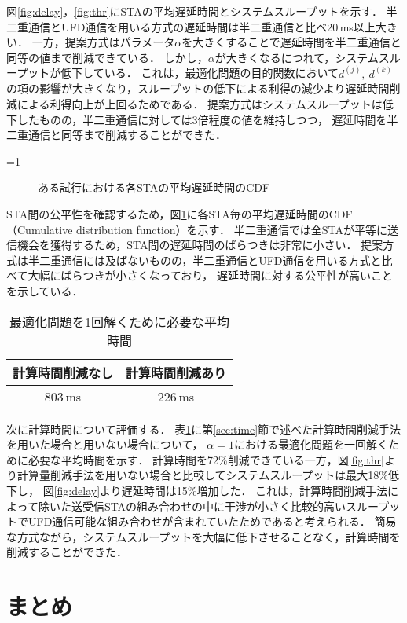 \documentclass[technicalreport]{ieicej}
\newcounter{flagFig}
\begin{document}
			\par
			図\ref{fig:delay}，\ref{fig:thr}にSTAの平均遅延時間とシステムスループットを示す．
			半二重通信とUFD通信を用いる方式の遅延時間は半二重通信と比べ20\,ms以上大きい．
			一方，提案方式はパラメータ$\alpha$を大きくすることで遅延時間を半二重通信と同等の値まで削減できている．
			しかし，$\alpha$が大きくなるにつれて，システムスループットが低下している．
			これは，最適化問題の目的関数において$d^{(j)},\ d^{(k)}$の項の影響が大きくなり，スループットの低下による利得の減少より遅延時間削減による利得向上が上回るためである．
			提案方式はシステムスループットは低下したものの，半二重通信に対しては3倍程度の値を維持しつつ，
			遅延時間を半二重通信と同等まで削減することができた．
			\par
			\ifnum\value{flagFig}=1 {\begin{figure}[t]
				\centering
					\caption{ある試行における各STAの平均遅延時間のCDF}
					\label{fig:cdf}
			\end{figure}}\fi
			STA間の公平性を確認するため，図\ref{fig:cdf}に各STA毎の平均遅延時間のCDF（Cumulative distribution function）を示す．
			半二重通信では全STAが平等に送信機会を獲得するため，STA間の遅延時間のばらつきは非常に小さい．
			提案方式は半二重通信には及ばないものの，半二重通信とUFD通信を用いる方式と比べて大幅にばらつきが小さくなっており，
			遅延時間に対する公平性が高いことを示している．



			\par
			\begin{table}[t]
				\centering
					\caption{最適化問題を1回解くために必要な平均時間}
					\label{tab:time}
					\begin{tabular}{cc}
						計算時間削減なし & 計算時間削減あり\\ \hline
						803\,ms & 226\,ms \\\hline
					\end{tabular}
			\end{table}
			次に計算時間について評価する．
			表\ref{tab:time}に第\ref{sec:time}節で述べた計算時間削減手法を用いた場合と用いない場合について，
			$\alpha=1$における最適化問題を一回解くために必要な平均時間を示す．
			計算時間を72\%削減できている一方，図\ref{fig:thr}より計算量削減手法を用いない場合と比較してシステムスループットは最大18\%低下し，
			図\ref{fig:delay}より遅延時間は15\%増加した．
			これは，計算時間削減手法によって除いた送受信STAの組み合わせの中に干渉が小さく比較的高いスループットでUFD通信可能な組み合わせが含まれていたためであると考えられる．
			簡易な方式ながら，システムスループットを大幅に低下させることなく，計算時間を削減することができた．

\section{まとめ}



\end{document}
